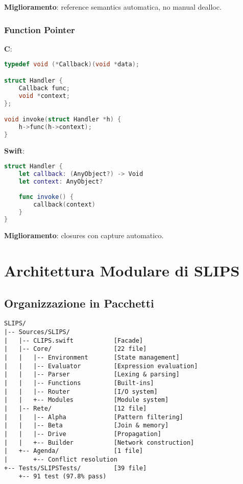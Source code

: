 \textbf{Miglioramento}: reference semantics automatica, no manual dealloc.

\subsubsection{Function Pointer}

\textbf{C}:
\begin{lstlisting}[language=C]
typedef void (*Callback)(void *data);

struct Handler {
    Callback func;
    void *context;
};

void invoke(struct Handler *h) {
    h->func(h->context);
}
\end{lstlisting}

\textbf{Swift}:
\begin{lstlisting}[language=Swift]
struct Handler {
    let callback: (AnyObject?) -> Void
    let context: AnyObject?
    
    func invoke() {
        callback(context)
    }
}
\end{lstlisting}

\textbf{Miglioramento}: closures con capture automatico.

\section{Architettura Modulare di SLIPS}

\subsection{Organizzazione in Pacchetti}

\begin{verbatim}
SLIPS/
|-- Sources/SLIPS/
|   |-- CLIPS.swift           [Facade]
|   |-- Core/                 [22 file]
|   |   |-- Environment       [State management]
|   |   |-- Evaluator         [Expression evaluation]
|   |   |-- Parser            [Lexing & parsing]
|   |   |-- Functions         [Built-ins]
|   |   |-- Router            [I/O system]
|   |   +-- Modules           [Module system]
|   |-- Rete/                 [12 file]
|   |   |-- Alpha             [Pattern filtering]
|   |   |-- Beta              [Join & memory]
|   |   |-- Drive             [Propagation]
|   |   +-- Builder           [Network construction]
|   +-- Agenda/               [1 file]
|       +-- Conflict resolution
+-- Tests/SLIPSTests/         [39 file]
    +-- 91 test (97.8% pass)
\end{verbatim}

